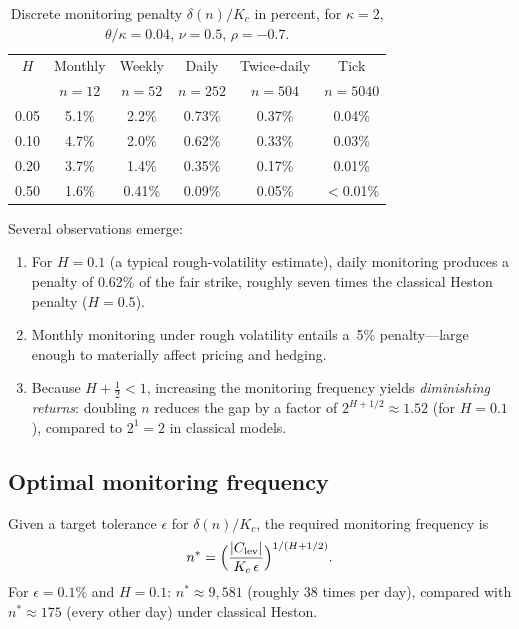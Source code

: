 \documentclass[12pt]{article}
\theoremstyle{definition}
\begin{document}
\begin{table}[htbp]
\centering
\caption{Discrete monitoring penalty $\delta(n)/K_c$ in percent,
for $\kappa\!=\!2$, $\theta/\kappa\!=\!0.04$, $\nu\!=\!0.5$,
$\rho\!=\!{-0.7}$.}
\label{tab:practical}
\begin{tabular}{cccccc}
\toprule
$H$ & Monthly & Weekly & Daily & Twice-daily & Tick \\
    & $n\!=\!12$ & $n\!=\!52$ & $n\!=\!252$ & $n\!=\!504$ & $n\!=\!5040$ \\
\midrule
0.05 & 5.1\% & 2.2\% & 0.73\% & 0.37\% & 0.04\% \\
0.10 & 4.7\% & 2.0\% & 0.62\% & 0.33\% & 0.03\% \\
0.20 & 3.7\% & 1.4\% & 0.35\% & 0.17\% & 0.01\% \\
0.50 & 1.6\% & 0.41\% & 0.09\% & 0.05\% & $<$0.01\% \\
\bottomrule
\end{tabular}
\end{table}

Several observations emerge:
\begin{enumerate}[label=(\roman*)]
\item For $H = 0.1$ (a typical rough-volatility estimate),
  daily monitoring produces a penalty of 0.62\% of the fair strike,
  roughly seven times the classical Heston penalty ($H = 0.5$).
\item Monthly monitoring under rough volatility entails
  a~5\% penalty---large enough to materially affect pricing
  and hedging.
\item Because $H + \tfrac12 < 1$, increasing the monitoring
  frequency yields \emph{diminishing returns}: doubling $n$ reduces
  the gap by a factor of $2^{H+1/2} \approx 1.52$ (for $H = 0.1$),
  compared to $2^1 = 2$ in classical models.
\end{enumerate}

\subsection{Optimal monitoring frequency}

Given a target tolerance $\epsilon$ for $\delta(n)/K_c$,
the required monitoring frequency is
\begin{equation}\label{eq:optimal-n}
  n^* = \Bigl(\frac{|C_{\mathrm{lev}}|}{K_c\,\epsilon}\Bigr)
  ^{1/(H+1/2)}.
\end{equation}
For $\epsilon = 0.1\%$ and $H = 0.1$:
$n^* \approx 9{,}581$ (roughly 38 times per day), compared with
$n^* \approx 175$ (every other day) under classical Heston.
\end{document}
